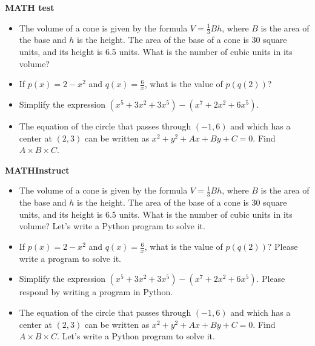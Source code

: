 \begin{tcolorbox}[title={MATHInstruct Rephrased Sample (before Sep. 30 2023)}]

\textbf{MATH test}

\begin{itemize}
    \item The volume of a cone is given by the formula \( V = \frac{1}{3}Bh \), where \( B \) is the area of the base and \( h \) is the height. The area of the base of a cone is 30 square units, and its height is 6.5 units. What is the number of cubic units in its volume?
    \item If \( p (x) = 2-x^2 \) and \( q(x) = \frac{6}{x} \), what is the value of \( p (q(2)) \)?
    \item Simplify the expression \( (x^5+3x^2+3x^5)-(x^7+2x^2+6x^5) \).
    \item The equation of the circle that passes through \( (-1,6) \) and which has a center at \( (2,3) \) can be written as \( x^2 + y^2 + Ax + By + C = 0 \). Find \( A \times B \times C \).
\end{itemize}

\vspace{0.2cm}

\textbf{MATHInstruct}

\begin{itemize}
    \item The volume of a cone is given by the formula \( V = \frac{1}{3}Bh \), where \( B \) is the area of the base and \( h \) is the height. The area of the base of a cone is 30 square units, and its height is 6.5 units. What is the number of cubic units in its volume? Let's write a Python program to solve it.
    \item If \( p (x) = 2-x^2 \) and \( q(x) = \frac{6}{x} \), what is the value of \( p (q(2)) \)? Please write a program to solve it.
    \item Simplify the expression \( (x^5+3x^2+3x^5)-(x^7+2x^2+6x^5) \). Please respond by writing a program in Python.
    \item The equation of the circle that passes through \( (-1,6) \) and which has a center at \( (2,3) \) can be written as \( x^2 + y^2 + Ax + By + C = 0 \). Find \( A \times B \times C \). Let's write a Python program to solve it.
\end{itemize}

\end{tcolorbox}


